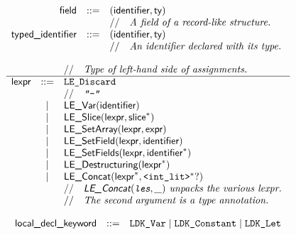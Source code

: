\documentclass{book}
\begin{document}
\[
\begin{array}{rcl}
\textsf{field} &::=& (\textsf{identifier}, \textsf{ty})\\
  & & //\quad\textit{A field of a record-like structure.}\ \\
\textsf{typed\_identifier} &::=& (\textsf{identifier}, \textsf{ty})\\
  & & //\quad\textit{An identifier declared with its type.}\ \\
\end{array}
\]

\[
\begin{array}{rcl}
& & //\quad\textit{Type of left-hand side of assignments.}\ \\
\hline
\textsf{lexpr} &::=& \texttt{LE\_Discard}\\
  & & //\quad\textit{\texttt{"-"}}\ \\
  &|& \textsf{LE\_Var}(\textsf{identifier})\\
  &|& \textsf{LE\_Slice}(\textsf{lexpr}, \textsf{slice}^*)\\
  &|& \textsf{LE\_SetArray}(\textsf{lexpr}, \textsf{expr})\\
  &|& \textsf{LE\_SetField}(\textsf{lexpr}, \textsf{identifier})\\
  &|& \textsf{LE\_SetFields}(\textsf{lexpr}, \textsf{identifier}^*)\\
  &|& \textsf{LE\_Destructuring}(\textsf{lexpr}^*)\\
  &|& \textsf{LE\_Concat}(\textsf{lexpr}^*, \texttt{<int\_lit>}^*?)\\
  & & //\quad\textit{$\textsf{LE\_Concat}(\texttt{les}, \_)$ unpacks the various lexpr.}\ \\
  & & //\quad\textit{The second argument is a type annotation.}\ \\
\end{array}
\]

\[
\begin{array}{rcl}
\textsf{local\_decl\_keyword} &::=& \texttt{LDK\_Var} \;|\; \texttt{LDK\_Constant} \;|\; \texttt{LDK\_Let}\\
\end{array}
\]
\end{document}
